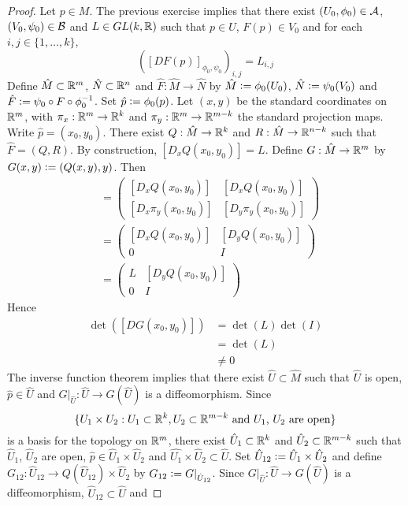 \documentclass{book}
\begin{document}
	\begin{proof} Let $p \in M$. The previous exercise implies that there exist $(U_0, \phi_0) \in \mathcal{A}$, $(V_0, \psi_0) \in \mathcal{B}$ and $L \in GL(k, \mathbb{R})$ such that $p \in U$, $F(p) \in V_0$ and for each $i,j \in \{1, \ldots, k\}$, 
		$$([DF(p)]_{\phi_0, \psi_0})_{i,j} = L_{i,j} $$ 
		Define $\hat{M} \subset \mathbb{R}^m$, $\hat{N} \subset \mathbb{R}^n$ and $\hat{F}: \hat{M} \rightarrow \hat{N}$ by $\hat{M} \vcentcolon= \phi_0(U_0)$, $\hat{N} \vcentcolon= \psi_0(V_0)$ and $\hat{F} \vcentcolon= \psi_0 \circ F \circ \phi_0^{-1}$. Set $\hat{p} \vcentcolon= \phi_0(p)$. Let $(x, y)$ be the standard coordinates on $\mathbb{R}^m$, with $\pi_x: \mathbb{R}^m \rightarrow \mathbb{R}^k$ and $\pi_y: \mathbb{R}^m \rightarrow \mathbb{R}^{m-k}$ the standard projection maps. Write $\hat{p} = (x_0, y_0)$. There exist $Q: \hat{M} \rightarrow \mathbb{R}^k$ and $R: \hat{M} \rightarrow  \mathbb{R}^{n-k}$ such that $\hat{F} = (Q, R)$. By construction, $[D_xQ(x_0, y_0)] = L$. Define $G: \hat{M} \rightarrow \mathbb{R}^m$ by $G(x, y) \vcentcolon= (Q(x, y), y)$. Then
		\begin{align*}
			[D G (x_0, y_0)] 
			& = \begin{pmatrix}
				[D_{x}Q(x_0, y_0)] & [D_{x}Q(x_0, y_0)] \\
				[D_{x} \pi_{y}(x_0, y_0)] &  	[D_{y} \pi_{y}(x_0, y_0) ]
			\end{pmatrix}  \\
			& = 
			\begin{pmatrix}
				[D_{x}Q(x_0, y_0)] & [D_{y}Q(x_0, y_0)] \\
				0 & I 
			\end{pmatrix} \\
			& = 
			\begin{pmatrix}
				L & [D_{y}Q(x_0, y_0)] \\
				0 & I 
			\end{pmatrix} 
		\end{align*}  
		Hence 
		\begin{align*}
			\det([D G (x_0, y_0)]) 
			& = \det(L) \det(I) \\
			& = \det(L) \\
			& \neq 0
		\end{align*}
		The inverse function theorem implies that there exist $\hat{U} \subset \hat{M}$ such that $\hat{U}$ is open, $\hat{p} \in \hat{U}$ and $G|_{\hat{U}}: \hat{U} \rightarrow G(\hat{U})$ is a diffeomorphism. Since 
		$$\{U_1 \times U_2: U_1 \subset \mathbb{R}^k, U_2 \subset \mathbb{R}^{m-k} \text{ and $U_1$, $U_2$ are open} \}$$ 
		is a basis for the topology on $\mathbb{R}^m$, there exist $\hat{U}_1 \subset \mathbb{R}^k$ and $\hat{U}_2 \subset \mathbb{R}^{m-k}$ such that $\hat{U}_1$, $\hat{U}_2$ are open, $\hat{p} \in \hat{U}_1 \times \hat{U}_2$ and $\hat{U_1} \times \hat{U}_2 \subset \hat{U}$. Set $\hat{U}_{12} \vcentcolon= \hat{U}_1 \times \hat{U}_2$ and define $G_{12} : \hat{U}_{12} \rightarrow Q(\hat{U}_{12}) \times \hat{U}_2$ by $G_{12} \vcentcolon= G|_{\hat{U}_{12}}$. Since $G|_{\hat{U}}: \hat{U} \rightarrow G(\hat{U})$ is a diffeomorphism, $\hat{U}_{12} \subset  \hat{U}$ and 

\end{proof}
\end{document}
